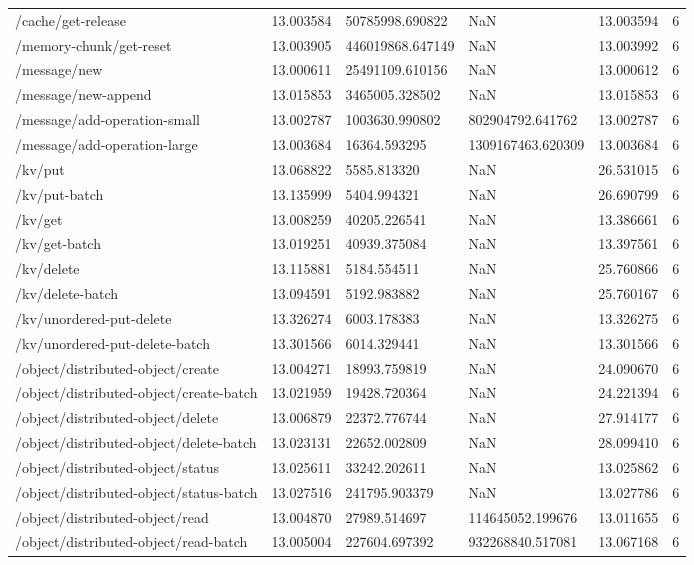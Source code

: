 \begin{tabularx}{\linewidth}{XXXXXX}
/cache/get-release & 13.003584 & 50785998.690822 & NaN & 13.003594 & 6 \\
/memory-chunk/get-reset & 13.003905 & 446019868.647149 & NaN & 13.003992 & 6 \\
/message/new & 13.000611 & 25491109.610156 & NaN & 13.000612 & 6 \\
/message/new-append & 13.015853 & 3465005.328502 & NaN & 13.015853 & 6 \\
/message/add-operation-small & 13.002787 & 1003630.990802 & 802904792.641762 & 13.002787 & 6 \\
/message/add-operation-large & 13.003684 & 16364.593295 & 1309167463.620309 & 13.003684 & 6 \\
/kv/put & 13.068822 & 5585.813320 & NaN & 26.531015 & 6 \\
/kv/put-batch & 13.135999 & 5404.994321 & NaN & 26.690799 & 6 \\
/kv/get & 13.008259 & 40205.226541 & NaN & 13.386661 & 6 \\
/kv/get-batch & 13.019251 & 40939.375084 & NaN & 13.397561 & 6 \\
/kv/delete & 13.115881 & 5184.554511 & NaN & 25.760866 & 6 \\
/kv/delete-batch & 13.094591 & 5192.983882 & NaN & 25.760167 & 6 \\
/kv/unordered-put-delete & 13.326274 & 6003.178383 & NaN & 13.326275 & 6 \\
/kv/unordered-put-delete-batch & 13.301566 & 6014.329441 & NaN & 13.301566 & 6 \\
/object/distributed-object/create & 13.004271 & 18993.759819 & NaN & 24.090670 & 6 \\
/object/distributed-object/create-batch & 13.021959 & 19428.720364 & NaN & 24.221394 & 6 \\
/object/distributed-object/delete & 13.006879 & 22372.776744 & NaN & 27.914177 & 6 \\
/object/distributed-object/delete-batch & 13.023131 & 22652.002809 & NaN & 28.099410 & 6 \\
/object/distributed-object/status & 13.025611 & 33242.202611 & NaN & 13.025862 & 6 \\
/object/distributed-object/status-batch & 13.027516 & 241795.903379 & NaN & 13.027786 & 6 \\
/object/distributed-object/read & 13.004870 & 27989.514697 & 114645052.199676 & 13.011655 & 6 \\
/object/distributed-object/read-batch & 13.005004 & 227604.697392 & 932268840.517081 & 13.067168 & 6 \\

\end{tabularx}
